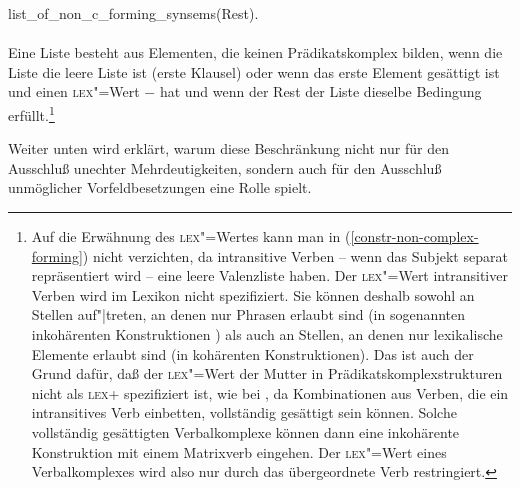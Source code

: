 \hfill        list\_of\_non\_c\_forming\_synsems(Rest).\\\\
\zs
Eine Liste besteht aus Elementen, die keinen Prädikatskomplex bilden, wenn die Liste
die leere Liste ist (erste Klausel) oder wenn das erste Element gesättigt ist
und einen \textsc{lex}"=Wert $-$ 
hat und wenn der Rest der Liste dieselbe Bedingung erfüllt.\footnote{\label{fn-lex-intransitiv}%
        Auf die Erwähnung des \textsc{lex}"=Wertes kann man in (\ref{constr-non-complex-forming}) nicht verzichten,
        da intransitive Verben -- wenn das Subjekt separat repräsentiert wird -- eine
        leere Valenzliste haben. Der \textsc{lex}"=Wert intransitiver Verben wird
        im Lexikon nicht spezifiziert. Sie können deshalb sowohl an Stellen auf"|treten,
        an denen nur Phrasen erlaubt sind (in sogenannten inkohärenten Konstruktionen \citep{Bech55a})
        als auch an Stellen, an denen nur lexikalische Elemente erlaubt sind (in kohärenten Konstruktionen).
        Das ist auch der Grund dafür, daß der \textsc{lex}"=Wert der Mutter in Prädikatskomplexstrukturen nicht als \textsc{lex}+ spezifiziert
        ist, wie \zb bei \citet{HN94a,dKM2001a}, da Kombinationen aus Verben, die ein intransitives Verb einbetten,
        vollständig gesättigt sein können. Solche vollständig gesättigten Verbalkomplexe können dann eine
        inkohärente Konstruktion mit einem Matrixverb eingehen. Der \textsc{lex}"=Wert eines Verbalkomplexes
        wird also nur durch das übergeordnete Verb restringiert.%
}

Weiter unten wird erklärt, warum diese Beschränkung nicht nur für den Ausschluß
unechter Mehrdeutigkeiten, sondern auch für den Ausschluß unmöglicher Vorfeldbesetzungen
eine Rolle spielt.

